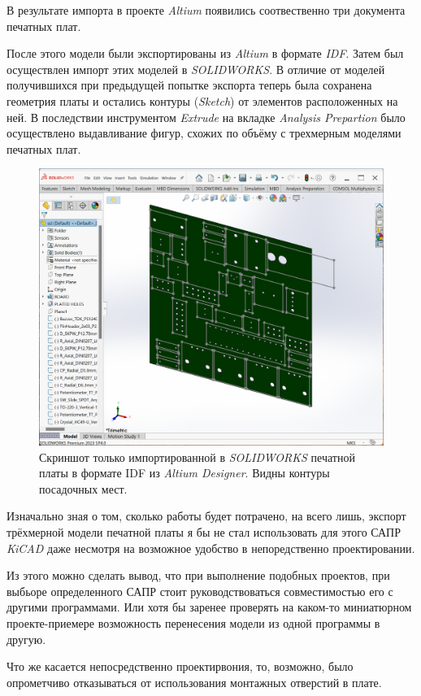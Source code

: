 В результате импорта в проекте \textit{Altium} появились соотвественно три документа печатных плат.

После этого модели были экспортированы из \textit{Altium} в формате \textit{IDF}. Затем был осуществлен импорт этих моделей в \textit{SOLIDWORKS}. В отличие от моделей получившихся при предыдущей попытке экспорта теперь была сохранена геометрия платы и остались контуры (\textit{Sketch}) от элементов расположенных на ней. В последствии инструментом \textit{Extrude} на вкладке \textit{Analysis Prepartion} было осуществлено выдавливание фигур, схожих по объёму с трехмерным моделями печатных плат.

\begin{figure}[h]
  \centering
  \includegraphics[scale=0.3]{../img/scrot/Screenshot-2024-05-08-132748.png}
  \caption{Скриншот только импортированной в \textit{SOLIDWORKS} печатной платы в формате IDF из \textit{Altium Designer}. Видны контуры посадочных мест.}

\end{figure}


Изначально зная о том, сколько работы будет потрачено, на всего лишь, экспорт трёхмерной модели печатной платы я бы не стал использовать для этого САПР \textit{KiCAD} даже несмотря на возможное удобство в непоредственно проектировании.

Из этого можно сделать вывод, что при выполнение подобных проектов, при выбьоре определенного САПР стоит руководствоваться совместимостью его с другими программами.
Или хотя бы заренее проверять на каком-то миниатюрном проекте-приемере возможность перенесения модели из одной программы в другую.

Что же касается непосредственно проектирвония, то, возможно, было опрометчиво отказываться от использования монтажных отверстий в плате.
